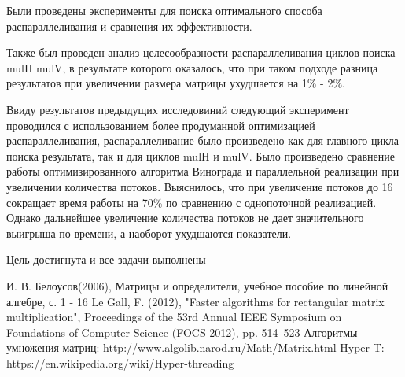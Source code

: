 \documentclass[12pt]{report}
\begin{document}
Были проведены эксперименты для поиска оптимального способа распараллеливания и сравнения их эффективности.

Также был проведен анализ целесообразности распараллеливания циклов поиска mulH mulV, в результате которого оказалось, что при таком подходе разница результатов при увеличении размера матрицы ухудшается на 1\% - 2\%. 

Ввиду результатов предыдущих исследовиний следующий эксперимент проводился с использованием более продуманной оптимизацией распараллеливания, распараллеливание было произведено как для главного цикла поиска результата, так и для циклов mulH и mulV.
Было произведено сравнение работы оптимизированного алгоритма Винограда и параллельной реализации при увеличении количества потоков. Выяснилось, что при увеличение потоков до 16 сокращает время работы на 70\% по сравнению с
однопоточной реализацией. Однако дальнейшее увеличение количества потоков не дает значительного выигрыша по времени, а наоборот ухудшаются показатели.

Цель достигнута и все задачи выполнены

 \begin{thebibliography}{3}
И. В. Белоусов(2006), Матрицы и определители, учебное пособие по линейной алгебре, с. 1 - 16
Le Gall, F. (2012), "Faster algorithms for rectangular matrix multiplication", Proceedings of the 53rd Annual IEEE Symposium on Foundations of Computer Science (FOCS 2012), pp. 514–523
Алгоритмы умножения матриц: {http://www.algolib.narod.ru/Math/Matrix.html}
Hyper-T: {https://en.wikipedia.org/wiki/Hyper-threading}
\end{thebibliography}
\end{document}
